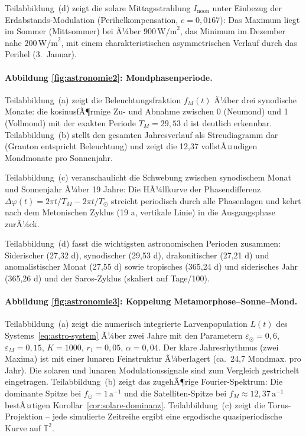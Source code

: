 ﻿\documentclass[12pt, a4paper]{article}
\theoremstyle{definition}
\begin{document}
Teilabbildung~(d) zeigt die solare Mittagsstrahlung $I_{\text{noon}}$ unter
Einbezug der Erdabstands-Modulation (Perihelkompensation, $e = 0{,}0167$):
Das Maximum liegt im Sommer (Mittsommer) bei Ã¼ber $900\,\text{W/m}^2$,
das Minimum im Dezember nahe $200\,\text{W/m}^2$, mit einem charakteristischen
asymmetrischen Verlauf durch das Perihel (3.~Januar).

\paragraph{Abbildung \ref{fig:astronomie2}: Mondphasenperiode.}
Teilabbildung~(a) zeigt die Beleuchtungsfraktion $f_M(t)$ Ã¼ber drei synodische
Monate: die kosinusfÃ¶rmige Zu- und Abnahme zwischen 0 (Neumond) und 1 (Vollmond)
mit der exakten Periode $T_M = 29{,}53$ d ist deutlich erkennbar. Teilabbildung~(b)
stellt den gesamten Jahresverlauf als Streudiagramm dar (Grauton entspricht
Beleuchtung) und zeigt die 12{,}37 vollstÃ¤ndigen Mondmonate pro Sonnenjahr.

Teilabbildung~(c) veranschaulicht die Schwebung zwischen synodischem Monat
und Sonnenjahr Ã¼ber 19 Jahre: Die HÃ¼llkurve der Phasendifferenz
$\Delta\varphi(t) = 2\pi t/T_M - 2\pi t/T_{\odot}$ streicht periodisch durch
alle Phasenlagen und kehrt nach dem Metonischen Zyklus (19 a, vertikale Linie)
in die Ausgangsphase zurÃ¼ck.

Teilabbildung~(d) fasst die wichtigsten astronomischen Perioden zusammen:
Siderischer (27{,}32 d), synodischer (29{,}53 d), drakonitischer (27{,}21 d)
und anomalistischer Monat (27{,}55 d) sowie tropisches (365{,}24 d) und
siderisches Jahr (365{,}26 d) und der Saros-Zyklus (skaliert auf Tage/100).

\paragraph{Abbildung \ref{fig:astronomie3}: Koppelung Metamorphose--Sonne--Mond.}
Teilabbildung~(a) zeigt die numerisch integrierte Larvenpopulation $L(t)$
des Systems~\eqref{eq:astro-system} Ã¼ber zwei Jahre mit den Parametern
$\varepsilon_{\odot} = 0{,}6$, $\varepsilon_M = 0{,}15$, $K = 1000$,
$r_1 = 0{,}05$, $\alpha = 0{,}04$. Der klare Jahresrhythmus (zwei Maxima)
ist mit einer lunaren Feinstruktur Ã¼berlagert (ca.\ 24{,}7 Mondmax. pro Jahr).
Die solaren und lunaren Modulationssignale sind zum Vergleich gestrichelt
eingetragen. Teilabbildung~(b) zeigt das zugehÃ¶rige Fourier-Spektrum:
Die dominante Spitze bei $f_{\odot} = 1\,\text{a}^{-1}$ und die
Satelliten-Spitze bei $f_M \approx 12{,}37\,\text{a}^{-1}$ bestÃ¤tigen
Korollar~\ref{cor:solare-dominanz}. Teilabbildung~(c) zeigt die
Torus-Projektion -- jede simulierte Zeitreihe ergibt eine ergodische
quasiperiodische Kurve auf $\mathbb{T}^2$.
\end{document}
